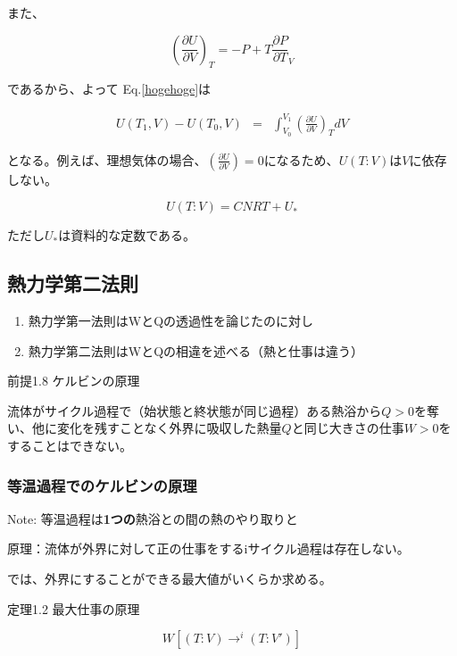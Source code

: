 また、

\begin{equation}
  \left(\frac{\partial U}{\partial V}\right)_T = -P + T \frac{\partial P}{\partial T}_V
\end{equation}

であるから、よって Eq.\ref{hogehoge}は

\begin{eqnarray}
  U(T_1, V) - U(T_0, V) 
     &=& \int_{V_0}^{V_1} \left(\frac{\partial U}{\partial V}\right)_T dV
  \label{hogehoge}
\end{eqnarray}

となる。例えば、理想気体の場合、$\left(\frac{\partial U}{\partial V}\right) = 0$になるため、$U(T:V)$は$V$に依存しない。

\begin{equation}
  U(T:V) = CNRT + U_*
\end{equation}

ただし$U_*$は資料的な定数である。

\subsection*{熱力学第二法則}

\begin{enumerate}
  \item 熱力学第一法則はWとQの透過性を論じたのに対し
  \item 熱力学第二法則はWとQの相違を述べる（熱と仕事は違う）
\end{enumerate}

前提1.8 ケルビンの原理

流体がサイクル過程で（始状態と終状態が同じ過程）ある熱浴から$Q>0$を奪い、他に変化を残すことなく外界に吸収した熱量$Q$と同じ大きさの仕事$W>0$をすることはできない。

\subsubsection{等温過程でのケルビンの原理}

Note: 等温過程は\textbf{1つの}熱浴との間の熱のやり取りと

原理：流体が外界に対して正の仕事をするiサイクル過程は存在しない。

では、外界にすることができる最大値がいくらか求める。

定理1.2 最大仕事の原理

\begin{equation}
  W[(T:V) \rightarrow^i (T:V')] 
\end{equation}